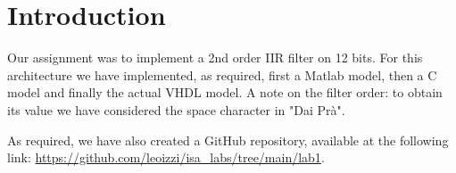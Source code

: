 \chapter{Introduction}

Our assignment was to implement a 2nd order IIR filter on 12 bits. For this architecture we have implemented, as required,
first a Matlab model, then a C model and finally the actual VHDL model.
A note on the filter order: to obtain its value we have considered the space character in "Dai Pr\`a".

As required, we have also created a GitHub repository, available at the following link: \url{https://github.com/leoizzi/isa_labs/tree/main/lab1}.